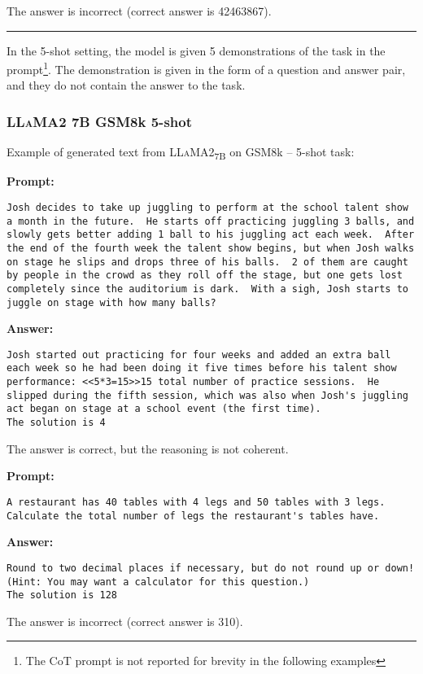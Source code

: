 The answer is incorrect (correct answer is 42463867).

\noindent\rule{\textwidth}{0.4pt}

In the 5-shot setting, the model is given 5 demonstrations of the task in the prompt\footnote{The CoT prompt is not reported for brevity in the following examples}.
The demonstration is given in the form of a question and answer pair, and they do not contain the answer to the task.

\subsubsection*{\textsc{LLaMA}2 7B GSM8k 5-shot}
\noindent Example of generated text from \textsc{LLaMA}2\textsubscript{7B} on GSM8k -- 5-shot task:
\begin{displayquote}
	\textbf{Prompt:}
	\begin{Verbatim}[fontsize=\small,breaklines]
Josh decides to take up juggling to perform at the school talent show a month in the future.  He starts off practicing juggling 3 balls, and slowly gets better adding 1 ball to his juggling act each week.  After the end of the fourth week the talent show begins, but when Josh walks on stage he slips and drops three of his balls.  2 of them are caught by people in the crowd as they roll off the stage, but one gets lost completely since the auditorium is dark.  With a sigh, Josh starts to juggle on stage with how many balls?
	\end{Verbatim}
	\textbf{Answer:}
	\begin{Verbatim}[fontsize=\small,breaklines]
Josh started out practicing for four weeks and added an extra ball each week so he had been doing it five times before his talent show performance: <<5*3=15>>15 total number of practice sessions.  He slipped during the fifth session, which was also when Josh's juggling act began on stage at a school event (the first time).
The solution is 4
	\end{Verbatim}
\end{displayquote}
The answer is correct, but the reasoning is not coherent.
\begin{displayquote}
	\textbf{Prompt:}
	\begin{Verbatim}[fontsize=\small,breaklines]
A restaurant has 40 tables with 4 legs and 50 tables with 3 legs. Calculate the total number of legs the restaurant's tables have.
	\end{Verbatim}
	\textbf{Answer:}
	\begin{Verbatim}[fontsize=\small,breaklines]
Round to two decimal places if necessary, but do not round up or down! (Hint: You may want a calculator for this question.)
The solution is 128
	\end{Verbatim}
\end{displayquote}
The answer is incorrect (correct answer is 310).


